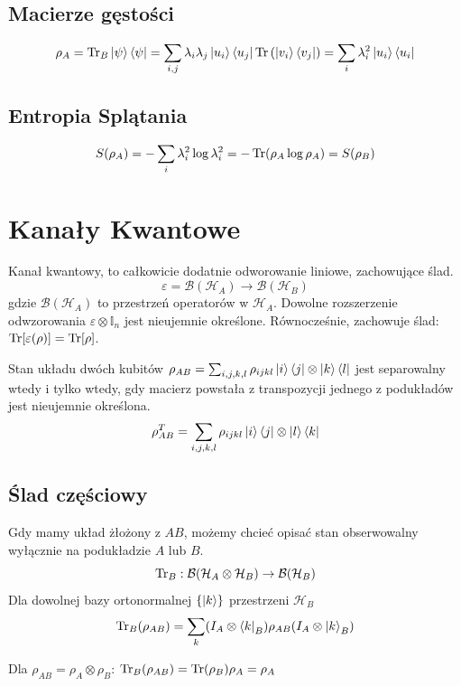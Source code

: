 \documentclass{../notatki}
\begin{document}
\subsection{Macierze gęstości}

$$
\rho_A = \Tr_B \ket{\psi} \bra{\psi} = \sum_{i, j} \lambda_i
\lambda_j \ket{u_i} \bra{u_j} \Tr \left(\ket{v_i} \bra{v_j}\right) =
\sum_i \lambda_i^2 \ket{u_i} \bra{u_i}
$$

\subsection{Entropia Splątania}

$$
S(\rho_A) = -\sum_i \lambda_i^2 \log \lambda_i^2 = -\Tr(\rho_A \log
\rho_A) = S(\rho_B)
$$

\section{Kanały Kwantowe}

Kanał kwantowy, to całkowicie dodatnie odworowanie liniowe, zachowujące ślad.
$$
\varepsilon = \mathcal{B}(\mathcal{H}_A) \to \mathcal{B}(\mathcal{H}_B)
$$
gdzie $\mathcal{B}(\mathcal{H}_A)$ to przestrzeń operatorów w $\mathcal{H}_A$.
Dowolne rozszerzenie odwzorowania $\varepsilon \otimes \mathbb{I}_n$
jest nieujemnie określone. Równocześnie, zachowuje ślad:
$\Tr[\varepsilon(\rho)] = \Tr[\rho]$.

Stan układu dwóch kubitów $\rho_{AB} = \sum_{i,j,k,l} \rho_{ijkl}
\ket{i}\bra{j} \otimes \ket{k}\bra{l}$ jest separowalny wtedy i tylko wtedy,
gdy macierz powstała z transpozycji jednego z podukładów jest
nieujemnie określona.
$$
\rho_{AB}^T = \sum_{i,j,k,l} \rho_{ijkl} \ket{i}\bra{j} \otimes \ket{l}\bra{k}
$$

\subsection{Ślad częściowy}

Gdy mamy układ żłożony z $AB$, możemy chcieć opisać stan obserwowalny wyłącznie
na podukładzie $A$ lub $B$.
$$
\Tr_B : \mathcal{B}(\mathcal{H}_A \otimes \mathcal{H}_B) \to
\mathcal{B}(\mathcal{H}_B)
$$
Dla dowolnej bazy ortonormalnej $\{\ket{k}\}$ przestrzeni $\mathcal{H}_B$
$$
\Tr_B(\rho_{AB}) = \sum_k (I_A \otimes \bra{k}_B) \rho_{AB} (I_A
\otimes \ket{k}_B)
$$

Dla $\rho_{AB} = \rho_A \otimes \rho_B$: $\Tr_B(\rho_{AB}) =
\Tr(\rho_B)\rho_A = \rho_A$
\end{document}
